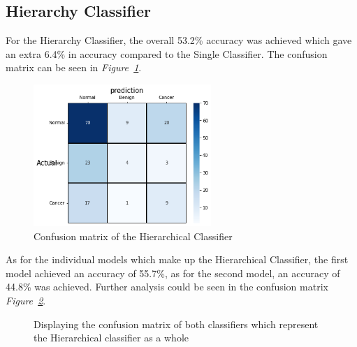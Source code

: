 \documentclass[12pt]{extarticle}
\begin{document}
	 \subsection{Hierarchy Classifier}
	 For the Hierarchy Classifier, the overall 53.2\% accuracy was achieved which gave an extra 6.4\% in accuracy compared to the Single Classifier. The confusion matrix can be seen in \emph{Figure~\ref{fig:conf-mat-hierarchy}}.\\
	 \begin{figure}[h]
	 	\centering
	 	\includegraphics[width=0.6\textwidth]{pics/Figures/hierarchy_conf_mat.png}
	 	\caption{\small{Confusion matrix of the Hierarchical Classifier}}
	 	\label{fig:conf-mat-hierarchy}
	 \end{figure}
 	 As for the individual models which make up the Hierarchical Classifier, the first model achieved an accuracy of 55.7\%, as for the second model, an accuracy of 44.8\% was achieved. Further analysis could be seen in the confusion matrix \emph{Figure~\ref{fig:two_models_conf_mat}}.
	 \begin{figure}
	 	\centering
	 	\qquad
	 	\caption{Displaying the confusion matrix of both classifiers which represent the Hierarchical classifier as a whole}
	 	\label{fig:two_models_conf_mat}
	\end{figure}
\end{document}
